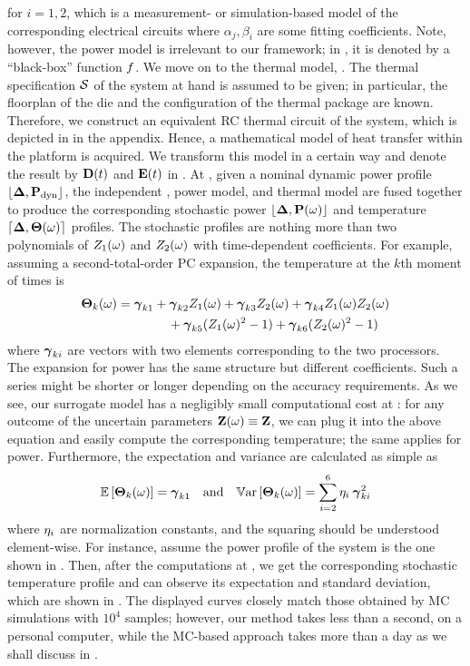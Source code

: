 for $i = 1, 2$, which is a measurement- or simulation-based model of the corresponding electrical circuits where $\alpha_j, \beta_i$ are some fitting coefficients. Note, however, the power model is irrelevant to our framework; in , it is denoted by a ``black-box'' function $f$. We move on to the thermal model, . The thermal specification $\mathcal{S}$ of the system at hand is assumed to be given; in particular, the floorplan of the die and the configuration of the thermal package are known. Therefore, we construct an equivalent RC thermal circuit of the system, which is depicted in  in the appendix. Hence, a mathematical model of heat transfer within the platform is acquired. We transform this model in a certain way and denote the result by $\mCF(\t)$ and $\mCS(\t)$ in . At , given a nominal dynamic power profile $\profPdyn$, the independent \rvs, power model, and thermal model are fused together to produce the corresponding stochastic power $\profP{\o}$ and temperature $\profT{\o}$ profiles. The stochastic profiles are nothing more than two polynomials of $Z_1(\omega)$ and $Z_2(\omega)$ with time-dependent coefficients. For example, assuming a second-total-order PC expansion, the temperature at the $k$th moment of times is
\begin{align*}
  {\boldsymbol\Theta}_k(\omega) &= {\boldsymbol\gamma}_{k1} + {\boldsymbol\gamma}_{k2} Z_1(\omega) + {\boldsymbol\gamma}_{k3} Z_2(\omega) + {\boldsymbol\gamma}_{k4} Z_1(\omega) Z_2(\omega) \\
  & \qquad \qquad {} + {\boldsymbol\gamma}_{k5} (Z_1(\omega)^2 - 1) + {\boldsymbol\gamma}_{k6} (Z_2(\omega)^2 - 1)
\end{align*}
where ${\boldsymbol\gamma}_{ki}$ are vectors with two elements corresponding to the two processors. The expansion for power has the same structure but different coefficients. Such a series might be shorter or longer depending on the accuracy requirements. As we see, our surrogate model has a negligibly small computational cost at : for any outcome of the uncertain parameters $\mathbf{Z}(\omega) \equiv \mathbf{Z}$, we can plug it into the above equation and easily compute the corresponding temperature; the same applies for power. Furthermore, the expectation and variance are calculated as simple as
\[
  \mathbb{E}\left[{\boldsymbol\Theta}_k(\omega)\right] = {\boldsymbol\gamma}_{k1} \hspace{1em} \text{and} \hspace{1em} \mathbb{V}\text{ar}\left[{\boldsymbol\Theta}_k(\omega)\right] = \sum_{i = 2}^{6} \eta_i \: {\boldsymbol\gamma}_{ki}^2
\]
where $\eta_i$ are normalization constants, and the squaring should be understood element-wise. For instance, assume the power profile of the system is the one shown in . Then, after the computations at , we get the corresponding stochastic temperature profile and can observe its expectation and standard deviation, which are shown in . The displayed curves closely match those obtained by MC simulations with $10^4$ samples; however, our method takes less than a second, on a personal computer, while the MC-based approach takes more than a day as we shall discuss in .

